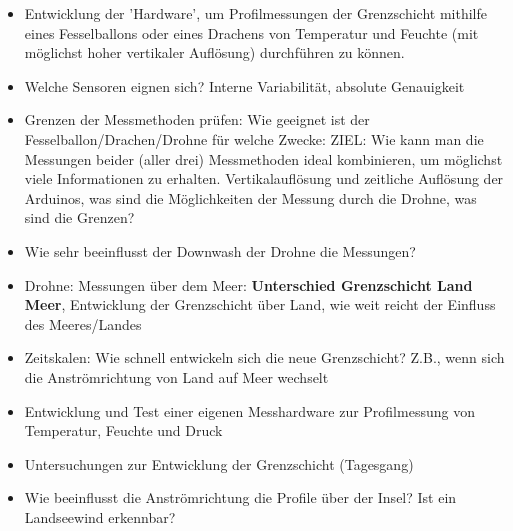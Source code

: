 \documentclass[a4paper,11pt,DIV=calc,tablecaptionabove,headinclude,twoside]{article}
\begin{document}
\begin{itemize}
\item Entwicklung der 'Hardware', um Profilmessungen der Grenzschicht mithilfe eines Fesselballons oder eines Drachens von Temperatur und Feuchte (mit möglichst hoher vertikaler Auflösung) durchführen zu können.
\item Welche Sensoren eignen sich? Interne Variabilität, absolute Genauigkeit
\item Grenzen der Messmethoden prüfen: Wie geeignet ist der Fesselballon/Drachen/Drohne für welche Zwecke: ZIEL: Wie kann man die Messungen beider (aller drei) Messmethoden ideal kombinieren, um möglichst viele Informationen zu erhalten. Vertikalauflösung und zeitliche Auflösung der Arduinos, was sind die Möglichkeiten der Messung durch die Drohne, was sind die Grenzen?
\item Wie sehr beeinflusst der Downwash der Drohne die Messungen?
\item Drohne: Messungen über dem Meer: \textbf{Unterschied Grenzschicht Land Meer}, Entwicklung der Grenzschicht über Land, wie weit reicht der Einfluss des Meeres/Landes
\item Zeitskalen: Wie schnell entwickeln sich die neue Grenzschicht? Z.B., wenn sich die Anströmrichtung von Land auf Meer wechselt
\item Entwicklung und Test einer eigenen Messhardware zur Profilmessung von
    Temperatur, Feuchte und Druck
\item Untersuchungen zur Entwicklung der Grenzschicht (Tagesgang)
\item Wie beeinflusst die Anströmrichtung die Profile über der Insel? Ist ein
    Landseewind erkennbar?
\end{itemize}
\end{document}
